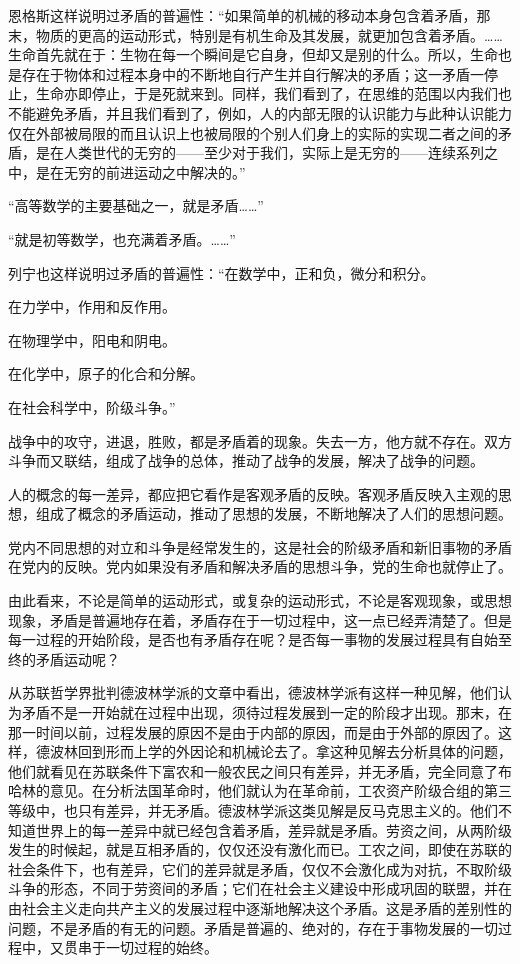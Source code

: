 恩格斯这样说明过矛盾的普遍性：“如果简单的机械的移动本身包含着矛盾，那末，物质的更高的运动形式，特别是有机生命及其发展，就更加包含着矛盾。……生命首先就在于：生物在每一个瞬间是它自身，但却又是别的什么。所以，生命也是存在于物体和过程本身中的不断地自行产生并自行解决的矛盾；这一矛盾一停止，生命亦即停止，于是死就来到。同样，我们看到了，在思维的范围以内我们也不能避免矛盾，并且我们看到了，例如，人的内部无限的认识能力与此种认识能力仅在外部被局限的而且认识上也被局限的个别人们身上的实际的实现二者之间的矛盾，是在人类世代的无穷的——至少对于我们，实际上是无穷的——连续系列之中，是在无穷的前进运动之中解决的。”

“高等数学的主要基础之一，就是矛盾……”

“就是初等数学，也充满着矛盾。……”

列宁也这样说明过矛盾的普遍性：“在数学中，正和负，微分和积分。

在力学中，作用和反作用。

在物理学中，阳电和阴电。

在化学中，原子的化合和分解。

在社会科学中，阶级斗争。”

战争中的攻守，进退，胜败，都是矛盾着的现象。失去一方，他方就不存在。双方斗争而又联结，组成了战争的总体，推动了战争的发展，解决了战争的问题。

人的概念的每一差异，都应把它看作是客观矛盾的反映。客观矛盾反映入主观的思想，组成了概念的矛盾运动，推动了思想的发展，不断地解决了人们的思想问题。

党内不同思想的对立和斗争是经常发生的，这是社会的阶级矛盾和新旧事物的矛盾在党内的反映。党内如果没有矛盾和解决矛盾的思想斗争，党的生命也就停止了。

由此看来，不论是简单的运动形式，或复杂的运动形式，不论是客观现象，或思想现象，矛盾是普遍地存在着，矛盾存在于一切过程中，这一点已经弄清楚了。但是每一过程的开始阶段，是否也有矛盾存在呢？是否每一事物的发展过程具有自始至终的矛盾运动呢？

从苏联哲学界批判德波林学派的文章中看出，德波林学派有这样一种见解，他们认为矛盾不是一开始就在过程中出现，须待过程发展到一定的阶段才出现。那末，在那一时间以前，过程发展的原因不是由于内部的原因，而是由于外部的原因了。这样，德波林回到形而上学的外因论和机械论去了。拿这种见解去分析具体的问题，他们就看见在苏联条件下富农和一般农民之间只有差异，并无矛盾，完全同意了布哈林的意见。在分析法国革命时，他们就认为在革命前，工农资产阶级合组的第三等级中，也只有差异，并无矛盾。德波林学派这类见解是反马克思主义的。他们不知道世界上的每一差异中就已经包含着矛盾，差异就是矛盾。劳资之间，从两阶级发生的时候起，就是互相矛盾的，仅仅还没有激化而已。工农之间，即使在苏联的社会条件下，也有差异，它们的差异就是矛盾，仅仅不会激化成为对抗，不取阶级斗争的形态，不同于劳资间的矛盾；它们在社会主义建设中形成巩固的联盟，并在由社会主义走向共产主义的发展过程中逐渐地解决这个矛盾。这是矛盾的差别性的问题，不是矛盾的有无的问题。矛盾是普遍的、绝对的，存在于事物发展的一切过程中，又贯串于一切过程的始终。

